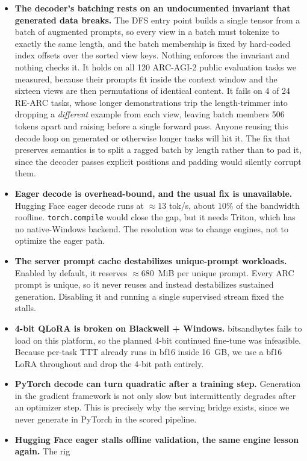 \documentclass[11pt]{article}
\begin{document}
\begin{itemize}[leftmargin=1.4em,itemsep=3pt]
\item \textbf{The decoder's batching rests on an undocumented invariant that generated data
breaks.} The DFS entry point builds a single tensor from a batch of augmented prompts, so every view
in a batch must tokenize to exactly the same length, and the batch membership is fixed by hard-coded
index offsets over the sorted view keys. Nothing enforces the invariant and nothing checks it. It
holds on all 120 ARC-AGI-2 public evaluation tasks we measured, because their prompts fit inside the
context window and the sixteen views are then permutations of identical content. It fails on 4 of 24
RE-ARC tasks, whose longer demonstrations trip the length-trimmer into dropping a \emph{different}
example from each view, leaving batch members 506 tokens apart and raising before a single forward
pass. Anyone reusing this decode loop on generated or otherwise longer tasks will hit it. The fix
that preserves semantics is to split a ragged batch by length rather than to pad it, since the
decoder passes explicit positions and padding would silently corrupt them.
\item \textbf{Eager decode is overhead-bound, and the usual fix is unavailable.} Hugging Face eager
decode runs at $\approx 13$ tok/s, about $10\%$ of the bandwidth roofline. \texttt{torch.compile}
would close the gap, but it needs Triton, which has no native-Windows backend. The resolution was to
change engines, not to optimize the eager path.
\item \textbf{The server prompt cache destabilizes unique-prompt workloads.} Enabled by default, it
reserves $\approx 680$~MiB per unique prompt. Every ARC prompt is unique, so it never reuses and
instead destabilizes sustained generation. Disabling it and running a single supervised stream fixed
the stalls.
\item \textbf{4-bit QLoRA is broken on Blackwell + Windows.} bitsandbytes fails to load on this
platform, so the planned 4-bit continued fine-tune was infeasible. Because per-task TTT already runs
in bf16 inside 16~GB, we use a bf16 LoRA throughout and drop the 4-bit path entirely.
\item \textbf{PyTorch decode can turn quadratic after a training step.} Generation in the gradient
framework is not only slow but intermittently degrades after an optimizer step. This is precisely why
the serving bridge exists, since we never generate in PyTorch in the scored pipeline.
\item \textbf{Hugging Face eager stalls offline validation, the same engine lesson again.} The rig

\end{itemize}
\end{document}
